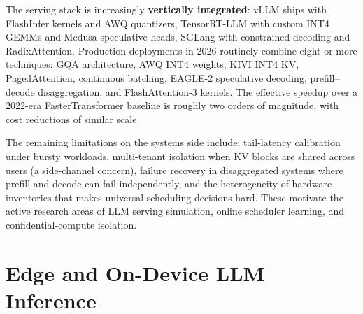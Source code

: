 The serving stack is increasingly \textbf{vertically integrated}: vLLM ships with FlashInfer kernels and AWQ quantizers, TensorRT-LLM with custom INT4 GEMMs and Medusa speculative heads, SGLang with constrained decoding and RadixAttention. Production deployments in 2026 routinely combine eight or more techniques: GQA architecture, AWQ INT4 weights, KIVI INT4 KV, PagedAttention, continuous batching, EAGLE-2 speculative decoding, prefill--decode disaggregation, and FlashAttention-3 kernels. The effective speedup over a 2022-era FasterTransformer baseline is roughly two orders of magnitude, with cost reductions of similar scale.

The remaining limitations on the systems side include: tail-latency calibration under bursty workloads, multi-tenant isolation when KV blocks are shared across users (a side-channel concern), failure recovery in disaggregated systems where prefill and decode can fail independently, and the heterogeneity of hardware inventories that makes universal scheduling decisions hard. These motivate the active research areas of LLM serving simulation, online scheduler learning, and confidential-compute isolation.

\section{Edge and On-Device LLM Inference}\label{edge-and-on-device-llm-inference}

